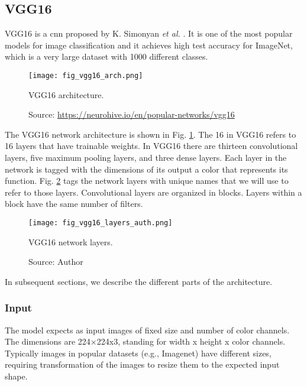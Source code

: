 \subsection{VGG16}
VGG16 is a \acrshort{cnn} proposed by K. Simonyan \textit{et al.} \cite{simonyan2014very}. It is one of the most popular models for image classification and it achieves high test accuracy for ImageNet, which is a very large dataset with 1000 different classes.
\begin{figure}[ht]
    \begin{center}       
    \texttt{[image: fig\_vgg16\_arch.png]}
    \caption[VGG16 architecture]{VGG16 architecture.}
    \caption*{Source: \href{https://neurohive.io/en/popular-networks/vgg16}{https://neurohive.io/en/popular-networks/vgg16}}
    \label{fig:vgg16_arch}
    \end{center}
\end{figure}

The VGG16 network architecture is shown in Fig. \ref{fig:vgg16_arch}. The 16 in VGG16 refers to 16 layers that have trainable weights. In VGG16 there are thirteen convolutional layers, five maximum pooling layers, and three dense layers. Each layer in the network is tagged with the dimensions of its output a color that represents its function. Fig. \ref{fig:vgg16_layers_auth} tags the network layers with unique names that we will use to refer to those layers. Convolutional layers are organized in blocks. Layers within a block have the same number of filters.
\begin{figure}[ht]
    \begin{center}       
    \texttt{[image: fig\_vgg16\_layers\_auth.png]}
    \caption[VGG16 network layers]{VGG16 network layers.}
    \caption*{Source: Author}
    \label{fig:vgg16_layers_auth}
    \end{center}
\end{figure}

In subsequent sections, we describe the different parts of the architecture.
\subsubsection{Input}
The model expects as input images of fixed size and number of color channels. The dimensions are 224×224x3, standing for width x height x color channels. Typically images in popular datasets (e.g., Imagenet) have different sizes, requiring transformation of the images to resize them to the expected input shape.

